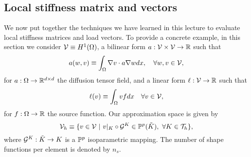 \subsection{Local stiffness matrix and vectors}
We now put together the techniques we have learned in this lecture to evaluate local stiffness matrices and load vectors.  To provide a concrete example, in this section we consider $\mathcal{V} \equiv H^1(\Omega)$, a bilinear form $a: \mathcal{V} \times \mathcal{V} \to \mathbb{R}$ such that
\begin{equation}
  a(w,v) \equiv \int_\Omega \nabla v \cdot a \nabla w dx , \quad \forall w,v \in \mathcal{V},
  \label{eq:fe_impl_model_a}
\end{equation}
for $a: \Omega \to \mathbb{R}^{d \times d}$ the diffusion tensor field, and a linear form $\ell: \mathcal{V} \to \mathbb{R}$ such that
\begin{equation}
  \ell(v) \equiv \int_\Omega v f dx \quad \forall v \in \mathcal{V},
  \label{eq:fe_impl_model_ell}
\end{equation}
for $f: \Omega \to \mathbb{R}$ the source function. Our approximation space is given by
\begin{equation}
  \calV_h \equiv \{ v \in \calV \ | \ v|_K \circ \calG^K \in \PP^p(\tilde K), \ \forall K \in \calT_h \},
  \label{eq:fe_impl_loc_vh}
\end{equation}
where $\mathcal{G}^K: \tilde K \to K$ is a $\mathbb{P}^p$ isoparametric mapping. The number of shape functions per element is denoted by $n_s$.

